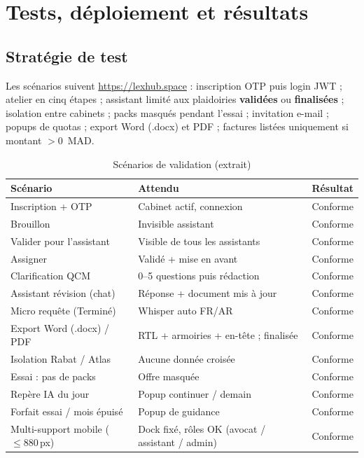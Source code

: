 \chapter{Tests, déploiement et résultats}
\label{ch:tests}

\section{Stratégie de test}

Les scénarios suivent \url{https://lexhub.space} : inscription OTP puis login JWT ; atelier en cinq étapes ; assistant limité aux plaidoiries \textbf{validées} ou \textbf{finalisées} ; isolation entre cabinets ; packs masqués pendant l'essai ; invitation e-mail ; popups de quotas ; export Word (.docx) et PDF ; factures listées uniquement si montant $> 0$~MAD.

\begin{table}[H]
\centering
\caption{Scénarios de validation (extrait)}
\label{tab:scenarios}
\small
\renewcommand{\arraystretch}{1.2}
\begin{tabular}{@{}p{3.6cm}p{5.2cm}p{3.6cm}@{}}
\toprule
\textbf{Scénario} & \textbf{Attendu} & \textbf{Résultat} \\
\midrule
Inscription + OTP & Cabinet actif, connexion & Conforme \\
Brouillon & Invisible assistant & Conforme \\
Valider pour l'assistant & Visible de tous les assistants & Conforme \\
Assigner & Validé + mise en avant & Conforme \\
Clarification QCM & 0--5 questions puis rédaction & Conforme \\
Assistant révision (chat) & Réponse + document mis à jour & Conforme \\
Micro requête (Terminé) & Whisper auto FR/AR & Conforme \\
Export Word (.docx) / PDF & RTL + armoiries + en-tête ; finalisée & Conforme \\
Isolation Rabat / Atlas & Aucune donnée croisée & Conforme \\
Essai : pas de packs & Offre masquée & Conforme \\
Repère IA du jour & Popup continuer / demain & Conforme \\
Forfait essai / mois épuisé & Popup de guidance & Conforme \\
Multi-support mobile ($\le 880$\,px) & Dock fixé, rôles OK (avocat / assistant / admin) & Conforme \\
\bottomrule
\end{tabular}
\end{table}

